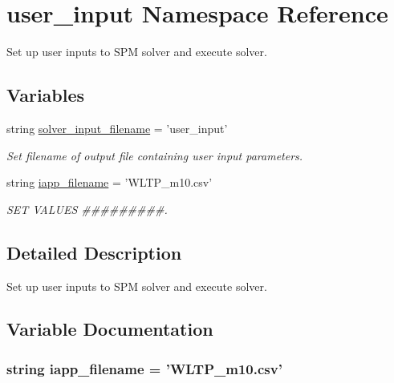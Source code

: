\hypertarget{namespaceuser__input}{\section{user\-\_\-input Namespace Reference}
\label{namespaceuser__input}
}


Set up user inputs to S\-P\-M solver and execute solver.  


\subsection*{Variables}
\begin{DoxyCompactItemize}
\item 
string \hyperlink{namespaceuser__input_a3f0eac40d15827c89da9b17cc74564dc}{solver\-\_\-input\-\_\-filename} = 'user\-\_\-input'
\begin{DoxyCompactList}\small\item\em Set filename of output file containing user input parameters. \end{DoxyCompactList}\item 
string \hyperlink{namespaceuser__input_af0a721bf4042ba266855bd73da684844}{iapp\-\_\-filename} = 'W\-L\-T\-P\-\_\-m10.\-csv'
\begin{DoxyCompactList}\small\item\em S\-E\-T V\-A\-L\-U\-E\-S \#\#\#\#\#\#\#\#\#. \end{DoxyCompactList}\end{DoxyCompactItemize}


\subsection{Detailed Description}
Set up user inputs to S\-P\-M solver and execute solver. 

\subsection{Variable Documentation}
\hypertarget{namespaceuser__input_af0a721bf4042ba266855bd73da684844}{
\subsubsection[{iapp\-\_\-filename}]{\setlength{\rightskip}{0pt plus 5cm}string iapp\-\_\-filename = 'W\-L\-T\-P\-\_\-m10.\-csv'}}\label{namespaceuser__input_af0a721bf4042ba266855bd73da684844}


